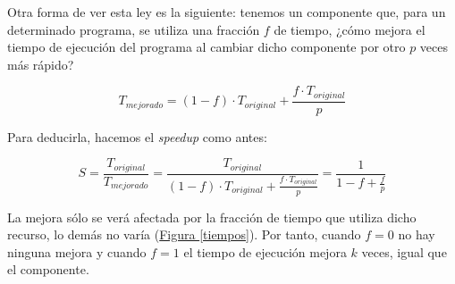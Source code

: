 \documentclass[10pt,a4paper,spanish]{report}
\begin{document}
Otra forma de ver esta ley es la siguiente: tenemos un componente que, para un determinado programa, se utiliza una fracción $f$ de tiempo, ¿cómo mejora el tiempo de ejecución del programa al cambiar dicho componente por otro $p$ veces más rápido?

\begin{displaymath}
    T_{mejorado} = (1 - f) \cdot T_{original} + \frac{f \cdot T_{original}}{p}
\end{displaymath}

Para deducirla, hacemos el \textit{\textcolor{azul}{speedup}} como antes:

\begin{displaymath}
    S = \frac{T_{original}}{T_{mejorado}} = \frac{T_{original}}{(1-f)\cdot T_{original} + \frac{f \cdot T_{original}}{p}} = \frac{1}{1 - f + \frac{f}{p}}
\end{displaymath}

La mejora sólo se verá afectada por la fracción de tiempo que utiliza dicho recurso, lo demás no varía (\hyperref[tiempos]{Figura \ref*{tiempos}}). Por tanto, cuando $f=0$ no hay ninguna mejora y cuando $f=1$ el tiempo de ejecución mejora $k$ veces, igual que el componente.






\end{document}
